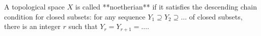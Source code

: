 A topological space $X$ is called **noetherian** if it satisfies the descending chain condition for closed subsets: for any sequence $Y_1 \supseteq Y_2 \supseteq \ldots$ of closed subsets, there is an integer $r$ such that $Y_r = Y_{r+1} = \ldots$.
